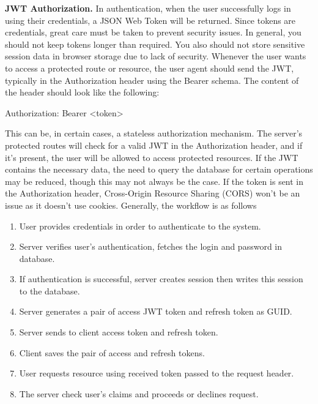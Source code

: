 \textbf{JWT Authorization.} In authentication, when the user successfully logs in using their credentials,
a JSON Web Token will be returned.
Since tokens are credentials, great care must be taken to prevent security issues.
In general, you should not keep tokens longer than required.
You also should not store sensitive session data in browser storage due to lack of security.
Whenever the user wants to access a protected route or resource, the user agent should send the JWT,
typically in the Authorization header using the Bearer schema.
The content of the header should look like the following:
\begin{spverbatim}

    Authorization: Bearer <token>

\end{spverbatim}
This can be, in certain cases, a stateless authorization mechanism.
The server's protected routes will check for a valid JWT in the Authorization header, and if it's present,
the user will be allowed to access protected resources.
If the JWT contains the necessary data, the need to query the database for certain operations may be reduced,
though this may not always be the case.
If the token is sent in the Authorization header, Cross-Origin Resource Sharing (CORS) won't be an issue
as it doesn't use cookies.
Generally, the workflow is as follows
\begin{enumerate}
    \item User provides credentials in order to authenticate to the system.
    \item Server verifies user's authentication, fetches the login and password in database.
    \item If authentication is successful, server creates session then writes this session to the database.
    \item Server generates a pair of access JWT token and refresh token as GUID.
    \item Server sends to client access token and refresh token.
    \item Client saves the pair of access and refresh tokens.
    \item User requests resource using received token passed to the request header.
    \item The server check user's claims and proceeds or declines request.
\end{enumerate}

